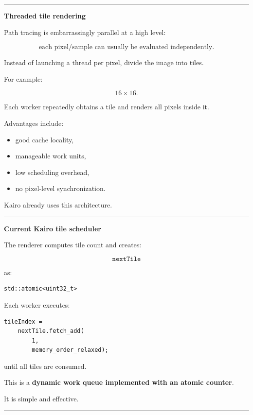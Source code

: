 \begin{center}\rule{0.5\linewidth}{0.5pt}\end{center}

\textbf{Threaded tile rendering}

Path tracing is embarrassingly parallel at a high level:

\[
\text{each pixel/sample can usually be evaluated independently}.
\]

Instead of launching a thread per pixel, divide the image into tiles.

For example:

\[
16\times16.
\]

Each worker repeatedly obtains a tile and renders all pixels inside it.

Advantages include:

\begin{itemize}
\tightlist
\item
  good cache locality,
\item
  manageable work units,
\item
  low scheduling overhead,
\item
  no pixel-level synchronization.
\end{itemize}

Kairo already uses this architecture.

\begin{center}\rule{0.5\linewidth}{0.5pt}\end{center}

\textbf{Current Kairo tile scheduler}

The renderer computes tile count and creates:

\[
\texttt{nextTile}
\]

as:

\begin{verbatim}
std::atomic<uint32_t>
\end{verbatim}

Each worker executes:

\begin{verbatim}
tileIndex =
    nextTile.fetch_add(
        1,
        memory_order_relaxed);
\end{verbatim}

until all tiles are consumed.

This is a \textbf{dynamic work queue implemented with an atomic counter}.

It is simple and effective.

\begin{center}\rule{0.5\linewidth}{0.5pt}\end{center}

